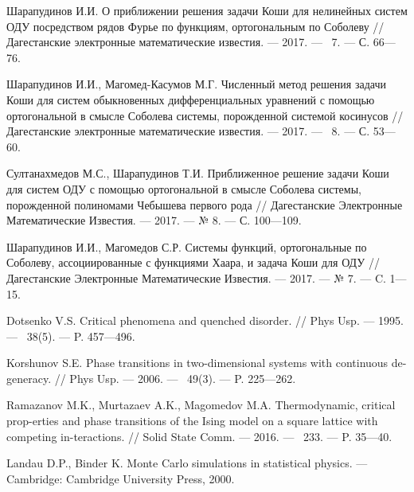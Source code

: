 \begin{thebibliography}{111}
{Шарапудинов И.И.} О приближении решения задачи Коши для нелинейных систем ОДУ посредством рядов Фурье по функциям, ортогональным по Соболеву // Дагестанские электронные математические известия. --- 2017. --- \No\ 7. --- С. 66---76.



{Шарапудинов И.И., Магомед-Касумов М.Г.} Численный метод решения задачи Коши для систем обыкновенных дифференциальных уравнений с помощью ортогональной в смысле Соболева системы, порожденной системой косинусов // Дагестанские электронные математические известия. --- 2017. --- \No\ 8. --- С. 53---60.



Султанахмедов М.С., Шарапудинов Т.И. Приближенное решение задачи Коши для систем ОДУ с помощью ортогональной в смысле Соболева системы, порожденной полиномами Чебышева первого рода // Дагестанские Электронные Математические Известия. --- 2017. --- № 8. --- С. 100---109.



Шарапудинов И.И., Магомедов С.Р. Системы функций, ортогональные по Соболеву, ассоциированные с функциями Хаара, и задача Коши для ОДУ // Дагестанские Электронные Математические Известия. --- 2017. --- № 7. --- C. 1---15.



Dotsenko V.S. Critical phenomena and quenched disorder. //
Phys Usp. --- 1995. --- \No\ 38(5). --- P. 457---496.



Korshunov S.E. Phase transitions in two-dimensional systems with continuous de-generacy. //
Phys Usp. --- 2006. --- \No\ 49(3). --- P. 225–--262.



Ramazanov M.K., Murtazaev A.K., Magomedov M.A.
Thermodynamic, critical prop-erties and phase transitions of the Ising model on a square lattice with competing in-teractions. //
Solid State Comm. --- 2016. --- \No\ 233. --- P. 35---40.



Landau D.P., Binder K.
Monte Carlo simulations in statistical physics. --- Cambridge: Cambridge University Press, 2000.







\end{thebibliography}
